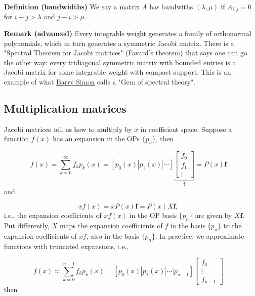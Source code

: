 \documentclass[12pt,a4paper]{article}
\begin{document}
\textbf{Definition (bandwidths)} We say a matrix $A$ has bandwiths $(\lambda, \mu)$ if $A_{i,j} = 0$ for $i-j > \lambda$ and $j-i > \mu$. 

\textbf{Remark (advanced)} Every integrable weight generates a family of orthonormal polynomials, which in turn generates a symmetric Jacobi matrix. There is a "Spectral Theorem for Jacobi matrices" (Favard's theorem) that says one can go the other way: every tridiagonal symmetric matrix with bounded entries is a Jacobi matrix for some integrable weight with compact support. This is an example of what \href{https://en.wikipedia.org/wiki/Barry_Simon}{Barry Simon} calls a "Gem of spectral theory".

\subsection{Multiplication matrices}
Jacobi matrices tell us how to multiply by $x$ in coefficient space.  Suppose a function $f(x)$ has an expansion in the OPs $\{ p_n \}$, then

\[
f(x) = \sum_{k = 0}^{\infty} f_k p_k(x) = [p_0(x) | p_1(x) | \ensuremath{\cdots}]\underbrace{\begin{bmatrix}
f_0 \\
f_1 \\
\vdots
\end{bmatrix}}_{\mathbf{f}} = P(x)\mathbf{f}
\]
and

\[
xf(x) = xP(x)\mathbf{f} = P(x) X\mathbf{f},
\]
i.e., the expansion coefficients of $xf(x)$ in the OP basis $\{ p_n \}$ are given by $X\mathbf{f}$. Put differently, $X$ maps the expansion coefficients of $f$ in the basis $\{ p_n \}$ to the expansion coefficients of $xf$, also in the basis $\{ p_n \}$.  In practice, we approximate functions with truncated expansions, i.e.,

\[
f(x) \approx \sum_{k = 0}^{n-1} f_k p_k(x) = [p_0(x) | p_1(x) | \ensuremath{\cdots} | p_{n-1}]\begin{bmatrix}
f_0 \\
\vdots \\
f_{n-1}
\end{bmatrix}
\]
then
\end{document}
